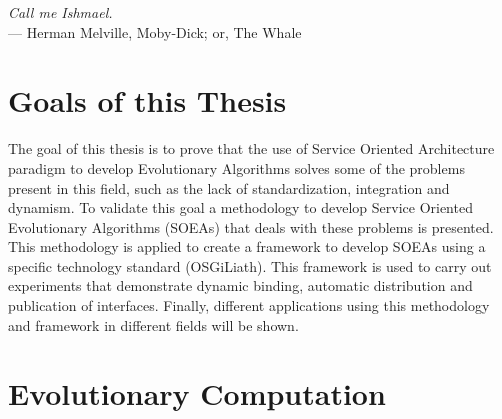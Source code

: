 \label{chap:introduction}
\begin{flushright}{\slshape
    Call me Ishmael.} \\ \medskip
    --- {Herman Melville, Moby-Dick; or, The Whale}
\end{flushright}
\minitoc\mtcskip
\vfill



\section{Goals of this Thesis} %
The goal of this thesis is to prove that the use of Service Oriented Architecture paradigm to develop Evolutionary Algorithms solves some of the problems present in this field, such as the lack of standardization, integration and dynamism. To validate this goal a methodology to develop Service Oriented Evolutionary Algorithms (SOEAs) that deals with these problems is presented. This methodology is applied to create a framework to develop SOEAs using a specific technology standard (OSGiLiath). This framework is used to carry out experiments that demonstrate dynamic binding, automatic distribution and publication of interfaces. Finally, different applications using this methodology and framework in different fields will be shown. %


\section{Evolutionary Computation}
\label{sec:intro:eas}


